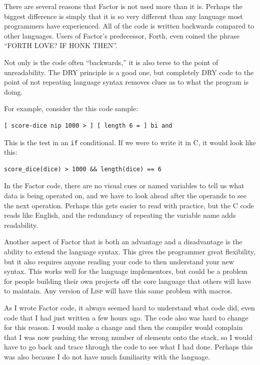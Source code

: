 \documentclass{article}
\begin{document}
There are several reasons that Factor is not used more than it is.  Perhaps the
biggest difference is simply that it is so very different than any language most
programmers have experienced.  All of the code is written backwards compared to
other languages.  Users of Factor's predecessor, Forth, even coined the phrase
``FORTH LOVE? IF HONK THEN''.

Not only is the code often ``backwards,'' it is also terse to the point of
unreadability.  The DRY principle is a good one, but completely DRY code to the
point of not repeating language syntax removes clues as to what the program is
doing.

For example, consider the this code sample:

\begin{verbatim}
[ score-dice nip 1000 > ] [ length 6 = ] bi and
\end{verbatim}

This is the test in an \texttt{if} conditional.  If we were to write it in C, it
would look like this:

\begin{verbatim}
score_dice(dice) > 1000 && length(dice) == 6
\end{verbatim}

In the Factor code, there are no visual cues or named variables to tell us what
data is being operated on, and we have to look ahead after the operands to see
the next operation.  Perhaps this gets easier to read with practice, but the C
code reads like English, and the redundancy of repeating the variable name adds
readability.

Another aspect of Factor that is both an advantage and a disadvantage is the
ability to extend the language syntax.  This gives the programmer great
flexibility, but it also requires anyone reading your code to then understand
your new syntax.  This works well for the language implementors, but could be a
problem for people building their own projects off the core language that others
will have to maintain.  Any version of \textsc{Lisp} will have this same problem
with macros.

As I wrote Factor code, it always seemed hard to understand what code did, even
code that I had just written a few hours ago.  The code also was hard to change
for this reason.  I would make a change and then the compiler would complain
that I was now pushing the wrong number of elements onto the stack, so I would
have to go back and trace through the code to see what I had done.  Perhaps this
was also because I do not have much familiarity with the language.
\end{document}
